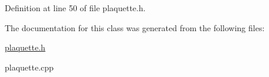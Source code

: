 Definition at line 50 of file plaquette.\+h.



The documentation for this class was generated from the following files\+:\begin{DoxyCompactItemize}
\item 
\hyperlink{plaquette_8h}{plaquette.\+h}\item 
plaquette.\+cpp\end{DoxyCompactItemize}

